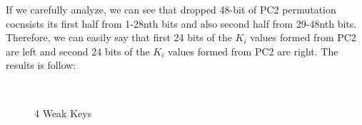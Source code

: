 \documentclass[11pt]{article}
\begin{document}
If we carefully analyze, we can see that dropped 48-bit of PC2 permutation cocnsists its first half from 1-28nth bits and also second half
from 29-48nth bits. Therefore, we can easily say that first 24 bits of the $K_{i}$ values formed from PC2 are left and second 24 bits of the $K_{i}$ values
formed from PC2 are right. The results is follow:

\begin{figure}[ht!]
  \centering
  \quad
  \\
  \caption{4 Weak Keys}
  \label{fig:4 Weak keys}
\end{figure}
\end{document}
